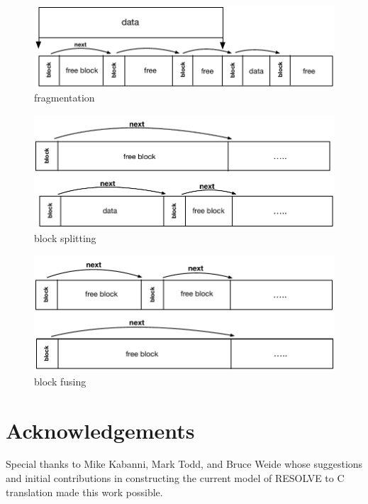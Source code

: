 \documentclass{sig-alternate}
\begin{document}
\begin{figure}[!htb]
\centering
\includegraphics[scale=.55]{figs/fragmentation.pdf}
\caption{fragmentation}
\end{figure}
\label{fig:fragmentation}

\begin{figure}[!htb]
\centering
\includegraphics[scale=.55]{figs/split.pdf}
\caption{block splitting}
\end{figure}
\label{fig:split}

\begin{figure}[!htb]
\centering
\includegraphics[scale=.55]{figs/fuse.pdf}
\caption{block fusing}
\end{figure}
\label{fig:fuse}
 

\section{Acknowledgements}

Special thanks to Mike Kabanni, Mark Todd, and Bruce Weide whose suggestions and initial contributions in constructing the current model of RESOLVE to C translation made this work possible. 



\end{document}

